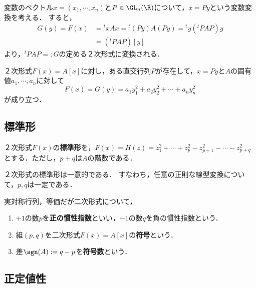 \documentclass[uplatex, dvipdfmx]{jsreport}
\begin{document}
\begin{discussion}[２次形式の変換]
    変数のベクトル$x=(x_1,\cdots,x_n)$と$P\in\GL_n(\R)$について，$x=Py$という変数変換を考える．
    すると，
    \begin{align*}
        G(y)=F(x)&={}^t\!xAx={}^t\!(Py)A(Py)={}^t\!y({}^t\!PAP)y\\
        &=({}^t\!PAP)[y]
    \end{align*}
    より，${}^t\!PAP=:G$の定める２次形式に変換される．
\end{discussion}

\begin{theorem}
    ２次形式$F(x)=A[x]$に対し，ある直交行列$P$が存在して，$x=Py$と$A$の固有値$a_1,\cdots,a_n$に対して
    \[
        F(x)=G(y)=a_1y_1^2+a_2y_2^2+\cdots+a_ny_n^2
    \]
    が成り立つ．
\end{theorem}

\subsection{標準形}

\begin{definition}
    ２次形式$F(x)$の\textbf{標準形}を，$F(x)=H(z)=z_1^2+\cdots+z_p^2-z^2_{p+1}-\cdots-z^2_{p+q}$とする．ただし，$p+q$は$A$の階数である．
\end{definition}

\begin{theorem}
    ２次形式の標準形は一意的である．
    すなわち，任意の正則な線型変換について，$p,q$は一定である．
\end{theorem}

\begin{definition}
    実対称行列，等価だが二次形式について，
    \begin{enumerate}
        \item $+1$の数$p$を\textbf{正の慣性指数}といい，$-1$の数$q$を負の慣性指数という．
        \item 組$(p,q)$を二次形式$F(x)=A[x]$の\textbf{符号}という．
        \item 差$\sgn(A):=q-p$を\textbf{符号数}という．
    \end{enumerate}
\end{definition}

\subsection{正定値性}
\end{document}
